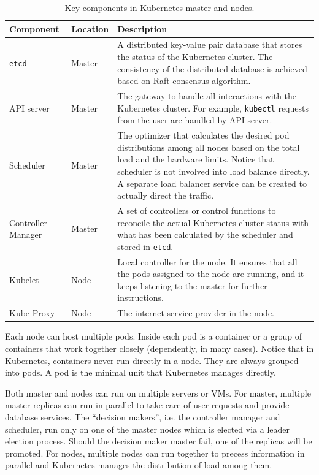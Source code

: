 \begin{table}[!htb]
	\centering
	\caption{Key components in Kubernetes master and nodes.} \label{ch:vac:tab:keycomponents}
	\begin{tabularx}{\textwidth}{llX}
		\hline
		Component & Location & Description \\
		\hline
		\verb|etcd| & Master & A distributed key-value pair database that stores the status of the Kubernetes cluster. The consistency of the distributed database is achieved based on Raft consensus algorithm. \\ \hline
		API server & Master & The gateway to handle all interactions with the Kubernetes cluster. For example, \verb|kubectl| requests from the user are handled by API server. \\ \hline
		Scheduler & Master & The optimizer that calculates the desired pod distributions among all nodes based on the total load and the hardware limits. Notice that scheduler is not involved into load balance directly. A separate load balancer service can be created to actually direct the traffic. \\ \hline
		Controller Manager & Master & A set of controllers or control functions to reconcile the actual Kubernetes cluster status with what has been calculated by the scheduler and stored in \verb|etcd|. \\ \hline
		Kubelet & Node & Local controller for the node. It ensures that all the pods assigned to the node are running, and it keeps listening to the master for further instructions. \\ \hline
		Kube Proxy & Node & The internet service provider in the node. \\
		\hline
	\end{tabularx}
\end{table}

Each node can host multiple pods. Inside each pod is a container or a group of containers that work together closely (dependently, in many cases). Notice that in Kubernetes, containers never run directly in a node. They are always grouped into pods. A pod is the minimal unit that Kubernetes manages directly.

Both master and nodes can run on multiple servers or VMs. For master, multiple master replicas can run in parallel to take care of user requests and provide database services. The ``decision makers'', i.e. the controller manager and scheduler, run only on one of the master nodes which is elected via a leader election process. Should the decision maker master fail, one of the replicas will be promoted. For nodes, multiple nodes can run together to precess information in parallel and Kubernetes manages the distribution of load among them.

